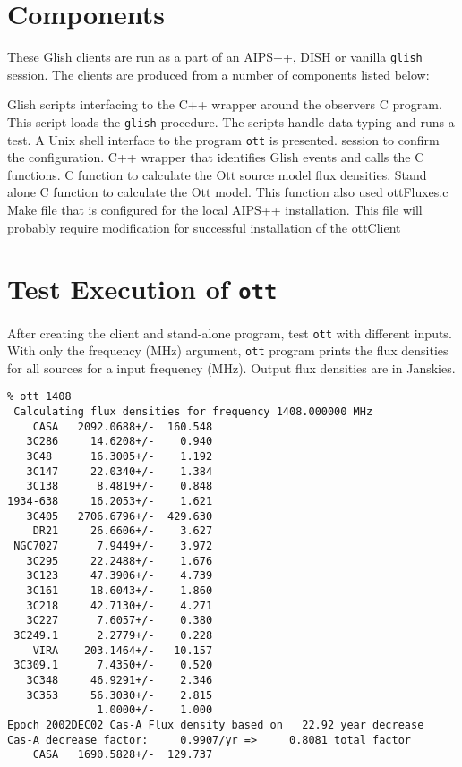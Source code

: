 \section{Components}
These Glish clients are run as a part of an AIPS++, DISH or vanilla {\tt glish}
session.  The clients are produced from a number of components listed below:
\begin{description}
  Glish scripts interfacing to the C++ wrapper
around the observers C program.  This script loads the {\tt glish} procedure.
The scripts handle data typing and runs a test.
A Unix shell interface to the program {\tt ott} is presented.
session to confirm the configuration.
 C++ wrapper that identifies Glish events
and calls the C functions.
  C function to calculate the Ott 
source model flux densities.
 Stand alone C function to calculate the Ott 
model.  This function also used ottFluxes.c
 Make file that is configured for the local AIPS++
installation.  This file will probably require modification for
successful installation of the ottClient
\end{description}

\section{Test Execution of {\tt ott}}
After creating the client and stand-alone program, test {\tt ott} 
with different inputs.
With only the frequency (MHz) argument, {\tt ott} program prints the 
flux densities for all sources for a input frequency (MHz).  Output
flux densities are in Janskies.

\begin{verbatim}
% ott 1408
 Calculating flux densities for frequency 1408.000000 MHz
    CASA   2092.0688+/-  160.548
   3C286     14.6208+/-    0.940
   3C48      16.3005+/-    1.192
   3C147     22.0340+/-    1.384
   3C138      8.4819+/-    0.848
1934-638     16.2053+/-    1.621
   3C405   2706.6796+/-  429.630
    DR21     26.6606+/-    3.627
 NGC7027      7.9449+/-    3.972
   3C295     22.2488+/-    1.676
   3C123     47.3906+/-    4.739
   3C161     18.6043+/-    1.860
   3C218     42.7130+/-    4.271
   3C227      7.6057+/-    0.380
 3C249.1      2.2779+/-    0.228
    VIRA    203.1464+/-   10.157
 3C309.1      7.4350+/-    0.520
   3C348     46.9291+/-    2.346
   3C353     56.3030+/-    2.815
              1.0000+/-    1.000
Epoch 2002DEC02 Cas-A Flux density based on   22.92 year decrease
Cas-A decrease factor:     0.9907/yr =>     0.8081 total factor
    CASA   1690.5828+/-  129.737
\end{verbatim}

